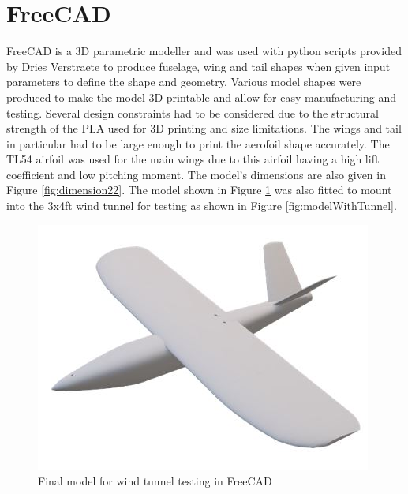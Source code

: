 \section{FreeCAD}
FreeCAD is a 3D parametric modeller and was used with python scripts provided by Dries Verstraete to produce fuselage, wing and tail shapes when given input parameters to define the shape and geometry. Various model shapes were produced to make the model 3D printable and allow for easy manufacturing and testing. Several design constraints had to be considered due to the structural strength of the PLA used for 3D printing and size limitations. The wings and tail in particular had to be large enough to print the aerofoil shape accurately.  The TL54 airfoil was used for the main wings due to this airfoil having a high lift coefficient and low pitching moment. The model's dimensions are also given in Figure \ref{fig:dimension22}. The model shown in Figure \ref{fig:freeCADModel} was also fitted to mount into the 3x4ft wind tunnel for testing as shown in Figure \ref{fig:modelWithTunnel}.


\begin{figure}[H]
\centering
\includegraphics[]{04_Methodology/Figs/model2.jpg}
\caption{Final model for wind tunnel testing in FreeCAD}
\label{fig:freeCADModel}
\end{figure}


